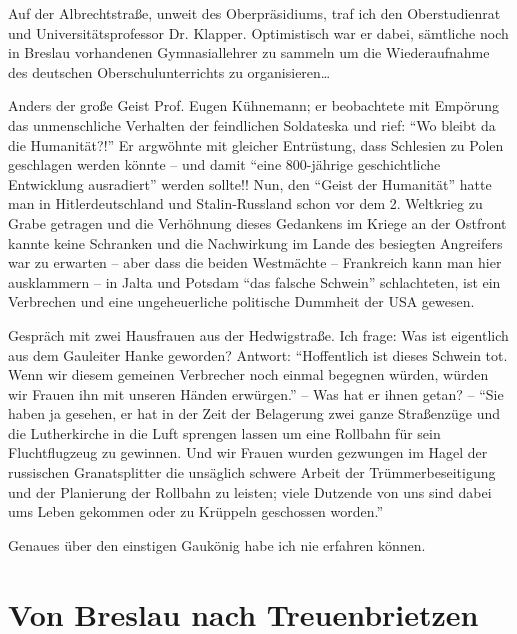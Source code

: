 Auf der Albrechtstraße, unweit des Oberpräsidiums, traf ich den Oberstudienrat und Universitätsprofessor Dr. Klapper. Optimistisch war er dabei, sämtliche noch in Breslau vorhandenen Gymnasiallehrer zu sammeln um die Wiederaufnahme des deutschen Oberschulunterrichts zu organisieren\dots

Anders der große Geist Prof. Eugen Kühnemann; er beobachtete mit Empörung das unmenschliche Verhalten der feindlichen Soldateska und rief: \enquote{Wo bleibt da die Humanität?!} Er argwöhnte mit gleicher Entrüstung, dass Schlesien zu Polen geschlagen werden könnte -- und damit \enquote{eine 800-jährige geschichtliche Entwicklung ausradiert} werden sollte!!  Nun, den \enquote{Geist der Humanität} hatte man in Hitlerdeutschland und Stalin-Russland schon vor dem 2. Weltkrieg zu Grabe getragen und die Verhöhnung dieses Gedankens im Kriege an der Ostfront kannte keine Schranken und die Nachwirkung im Lande des besiegten Angreifers war zu erwarten -- aber dass die beiden Westmächte -- Frankreich kann man hier ausklammern -- in Jalta und Potsdam \enquote{das falsche Schwein} schlachteten, ist ein Verbrechen und eine ungeheuerliche politische Dummheit der USA gewesen.

Gespräch mit zwei Hausfrauen aus der Hedwigstraße. Ich frage: Was ist eigentlich aus dem Gauleiter Hanke geworden? Antwort: \enquote{Hoffentlich ist dieses Schwein tot. Wenn wir diesem gemeinen Verbrecher noch einmal begegnen würden, würden wir Frauen ihn mit unseren Händen erwürgen.} -- Was hat er ihnen getan? -- \enquote{Sie haben ja gesehen, er hat in der Zeit der Belagerung zwei ganze Straßenzüge und die Lutherkirche in die Luft sprengen lassen um eine Rollbahn für sein Fluchtflugzeug zu gewinnen. Und wir Frauen wurden gezwungen im Hagel der  russischen Granatsplitter die unsäglich schwere Arbeit der Trümmerbeseitigung und der Planierung der Rollbahn zu leisten; viele Dutzende von uns sind dabei ums Leben gekommen oder zu Krüppeln geschossen worden.}

Genaues über den einstigen Gaukönig habe ich nie erfahren können.

\section{Von Breslau nach Treuenbrietzen}

